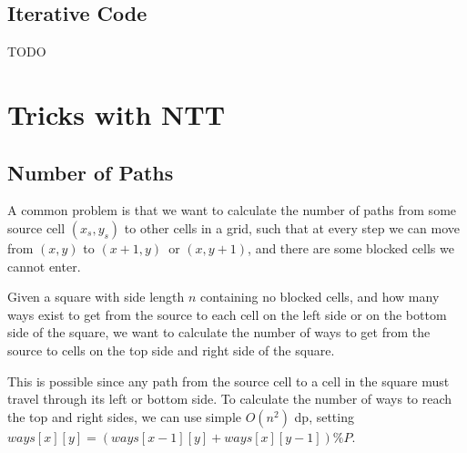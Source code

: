 \documentclass{article}
\begin{document}
\subsection{Iterative Code}
TODO

\section{Tricks with NTT}
\subsection{Number of Paths}
A common problem is that we want to calculate the number of paths from some source cell $(x_{s}, y_{s})$ to other cells in a grid,
such that at every step we can move from $(x, y)$ to $(x+1, y)$ or $(x, y+1)$, and there are some blocked cells we cannot enter.

Given a square with side length $n$ containing no blocked cells, and how many ways exist to get from the source to each cell on the left side
or on the bottom side of the square, we want to calculate the number of ways to get from the source to cells on the top side and right side of the square.

This is possible since any path from the source cell to a cell in the square must travel through its left or bottom side. To calculate the number of ways
to reach the top and right sides, we can use simple $O(n^{2})$ dp, setting $ways[x][y] = (ways[x-1][y] + ways[x][y-1]) \% P$.
\end{document}
